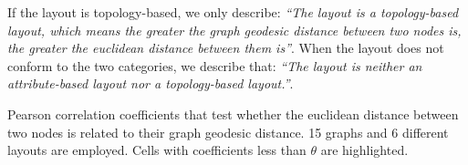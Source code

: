 If the layout is topology-based, we only describe: \textit{``The layout is a topology-based layout, which means the greater the graph geodesic distance between two nodes is, the greater the euclidean distance between them is''}.
When the layout does not conform to the two categories, we describe that: \textit{``The layout is neither an attribute-based layout nor a topology-based layout.''}.

\begin{table}[ht]
\caption{\label{tab:pearson-correlation}Pearson correlation coefficients that test whether the euclidean distance between two nodes is related to their graph geodesic distance. 15 graphs and 6 different layouts are employed. Cells with coefficients less than $\theta$ are highlighted.}

\setlength{\tabcolsep}{1.5mm}{

}
\end{table}
